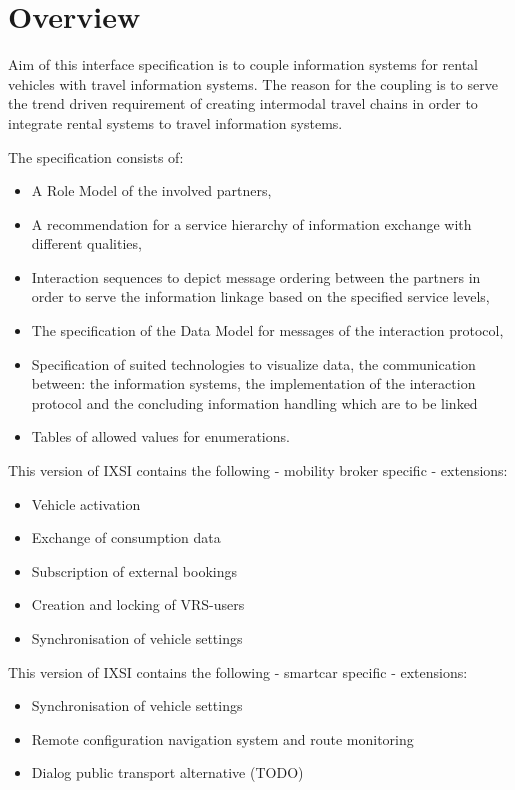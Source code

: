 \chapter{Overview}
\label{cha:Zusammenfassung}

Aim of this interface specification is to couple information systems for rental vehicles with travel information systems.
The reason for the coupling is to serve the trend driven requirement of creating intermodal travel chains in order to integrate rental systems to travel information systems.

The specification consists of:
\begin{itemize}
\item A Role Model of the involved partners,
\item A recommendation for a service hierarchy of information exchange with different qualities,
\item Interaction sequences to depict message ordering between the partners in order to serve the information linkage based on the specified service levels,
\item The specification of the Data Model for messages of the interaction protocol,
\item Specification of suited technologies to visualize data, the communication between: the information systems, the implementation of the interaction protocol and the concluding information handling which are to be linked
\item Tables of allowed values for enumerations.
\end{itemize}
This version of IXSI contains the following - mobility broker specific - extensions:
\begin{itemize}
	\item Vehicle activation 
	\item Exchange of consumption data 
	\item Subscription of external bookings
	\item Creation and locking of VRS-users
	\item Synchronisation of vehicle settings 
\end{itemize}
This version of IXSI contains the following -  smartcar specific - extensions:
\begin{itemize}
	\item Synchronisation of vehicle settings
	\item Remote configuration navigation system and route monitoring
	\item Dialog public transport alternative (TODO)
\end{itemize}
